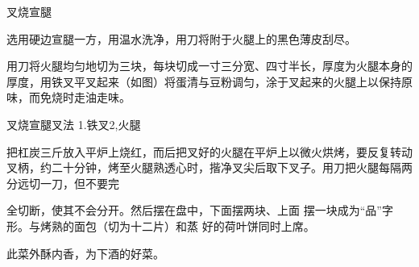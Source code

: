\begin{recipe}{叉烧宣腿}

\ingredients


\cooking

\step 选用硬边宣腿一方，用温水洗净，用刀将附于火腿上的黑色薄皮刮尽。

\step 用刀将火腿均匀地切为三块，每块切成一寸三分宽、四寸半长，厚度为火腿本身的厚度，用铁叉平叉起来（如图）将蛋清与豆粉调匀，涂于叉起来的火腿上以保持原味，而免烧时走油走味。

叉烧宣腿叉法 1.铁叉2,火腿

\step 把杠炭三斤放入平炉上烧红，而后把叉好的火腿在平炉上以微火烘烤，要反复转动叉柄，约二十分钟，烤至火腿熟透心时，揩净叉尖后取下叉子。用刀把火腿每隔两分远切一刀，但不要完

全切断，使其不会分开。然后摆在盘中，下面摆两块、上面 摆一块成为“品”字形。与烤熟的面包（切为十二片）和蒸 好的荷叶饼同时上席。

\notes

此菜外酥内香，为下酒的好菜。

\end{recipe}

